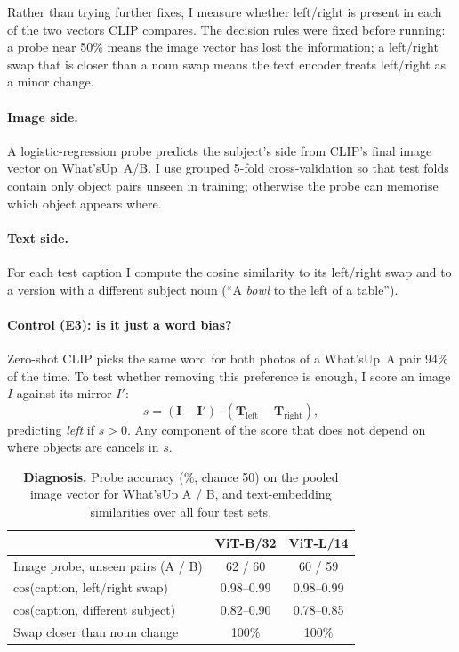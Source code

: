 \documentclass[10pt,twocolumn,letterpaper]{article}
\begin{document}
Rather than trying further fixes, I measure whether left/right is present in each of the two vectors CLIP compares.
The decision rules were fixed before running: a probe near 50\% means the image vector has lost the information; a left/right swap that is closer than a noun swap means the text encoder treats left/right as a minor change.

\paragraph{Image side.}
A logistic-regression probe predicts the subject's side from CLIP's final image vector on What'sUp~A/B.
I use grouped 5-fold cross-validation so that test folds contain only object pairs unseen in training; otherwise the probe can memorise which object appears where.

\paragraph{Text side.}
For each test caption I compute the cosine similarity to its left/right swap and to a version with a different subject noun (\eg ``A \emph{bowl} to the left of a table'').

\paragraph{Control (E3): is it just a word bias?}
Zero-shot CLIP picks the same word for both photos of a What'sUp~A pair 94\% of the time.
To test whether removing this preference is enough, I score an image $I$ against its mirror $I'$:
\begin{equation}
s = (\mathbf{I} - \mathbf{I}') \cdot (\mathbf{T}_\text{left} - \mathbf{T}_\text{right}),
\label{eq:mirror}
\end{equation}
predicting \emph{left} if $s>0$.
Any component of the score that does not depend on where objects are cancels in $s$.

\begin{table}[t]
\centering
\small
\setlength{\tabcolsep}{4pt}
\begin{tabular}{@{}lcc@{}}
\toprule
 & ViT-B/32 & ViT-L/14 \\
\midrule
Image probe, unseen pairs (A / B) & 62 / 60 & 60 / 59 \\
cos(caption, left/right swap)          & 0.98--0.99 & 0.98--0.99 \\
cos(caption, different subject)        & 0.82--0.90 & 0.78--0.85 \\
Swap closer than noun change           & 100\% & 100\% \\
\bottomrule
\end{tabular}
\caption{\textbf{Diagnosis.} Probe accuracy (\%, chance 50) on the pooled image vector for What'sUp A / B, and text-embedding similarities over all four test sets.}
\label{tab:diag}
\end{table}
\end{document}
